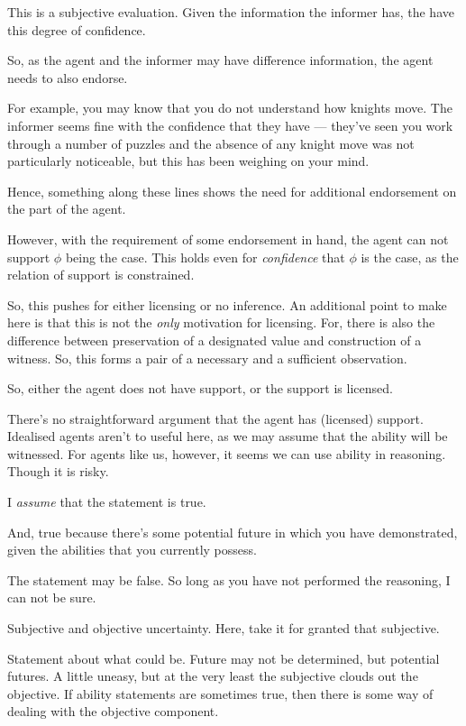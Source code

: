 \documentclass[10pt]{article}
\begin{document}
\begin{note}
  This is a subjective evaluation.
  Given the information the informer has, the have this degree of confidence.

  So, as the agent and the informer may have difference information, the agent needs to also endorse.

  For example, you may know that you do not understand how knights move.
  The informer seems fine with the confidence that they have --- they've seen you work through a number of puzzles and the absence of any knight move was not particularly noticeable, but this has been weighing on your mind.

  Hence, something along these lines shows the need for additional endorsement on the part of the agent.

  However, with the requirement of some endorsement in hand, the agent can not support \(\phi\) being the case.
  This holds even for \emph{confidence} that \(\phi\) is the case, as the relation of support is constrained.

  So, this pushes for either licensing or no inference.
  An additional point to make here is that this is not the \emph{only} motivation for licensing.
  For, there is also the difference between preservation of a designated value and construction of a witness.
  So, this forms a pair of a necessary and a sufficient observation.

  So, either the agent does not have support, or the support is licensed.

  There's no straightforward argument that the agent has (licensed) support.
  Idealised agents aren't to useful here, as we may assume that the ability will be witnessed.
  For agents like us, however, it seems we can use ability in reasoning.
  Though it is risky.
\end{note}

\begin{note}
  I \emph{assume} that the statement is true.

  And, true because there's some potential future in which you have demonstrated, given the abilities that you currently possess.

  The statement may be false.
  So long as you have not performed the reasoning, I can not be sure.

  Subjective and objective uncertainty.
  Here, take it for granted that subjective.

  Statement about what could be.
  Future may not be determined, but potential futures.
  A little uneasy, but at the very least the subjective clouds out the objective.
  If ability statements are sometimes true, then there is some way of dealing with the objective component.
\end{note}
\end{document}
